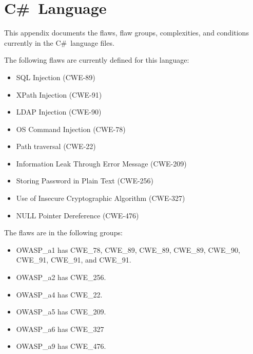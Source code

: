 \documentclass[12pt]{article}
\newcommand{\CSharp}{C{\fontseries{b}\selectfont\#}}
\begin{document}



\newpage

%
%

\clearpage

\appendix

\section{\CSharp\ Language}
\label{sec:CSharp language}

This appendix documents the flaws, flaw groups, complexities, and conditions
currently in the
\CSharp\ language files.

The following flaws are currently defined for this language:
\begin{itemize}[nosep]
    \item SQL Injection (CWE-89)
    \item XPath Injection (CWE-91)
    \item LDAP Injection (CWE-90)
    \item OS Command Injection (CWE-78)
    \item Path traversal (CWE-22)
    \item Information Leak Through Error Message (CWE-209)
    \item Storing Password in Plain Text (CWE-256)
    \item Use of Insecure Cryptographic Algorithm (CWE-327)
    \item NULL Pointer Dereference (CWE-476)
\end{itemize}

\vspace{1em}

The flaws are in the following groups:
\begin{itemize}[nosep]
    \item OWASP\_a1 has CWE\_78, CWE\_89, CWE\_89, CWE\_89, CWE\_90, CWE\_91,
      CWE\_91, and CWE\_91.
    \item OWASP\_a2 has CWE\_256.
    \item OWASP\_a4 has CWE\_22.
    \item OWASP\_a5 has CWE\_209.
    \item OWASP\_a6 has CWE\_327
    \item OWASP\_a9 has CWE\_476.
\end{itemize}
\end{document}
